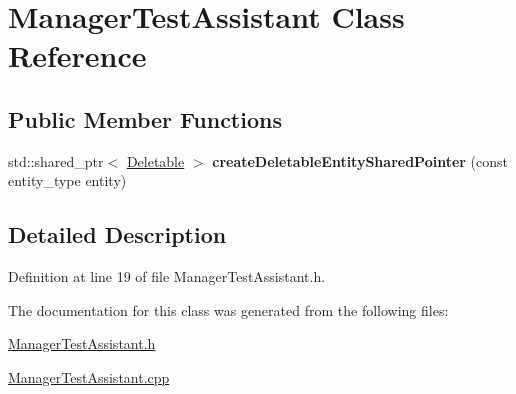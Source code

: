 \hypertarget{class_manager_test_assistant}{\section{Manager\+Test\+Assistant Class Reference}
\label{class_manager_test_assistant}
}
\subsection*{Public Member Functions}
\begin{DoxyCompactItemize}
\item 
\hypertarget{class_manager_test_assistant_aba7ce13afa76fd729f46247edc4a73a5}{std\+::shared\+\_\+ptr$<$ \hyperlink{class_deletable}{Deletable} $>$ {\bfseries create\+Deletable\+Entity\+Shared\+Pointer} (const entity\+\_\+type entity)}\label{class_manager_test_assistant_aba7ce13afa76fd729f46247edc4a73a5}

\end{DoxyCompactItemize}


\subsection{Detailed Description}


Definition at line 19 of file Manager\+Test\+Assistant.\+h.



The documentation for this class was generated from the following files\+:\begin{DoxyCompactItemize}
\item 
\hyperlink{_manager_test_assistant_8h}{Manager\+Test\+Assistant.\+h}\item 
\hyperlink{_manager_test_assistant_8cpp}{Manager\+Test\+Assistant.\+cpp}\end{DoxyCompactItemize}
